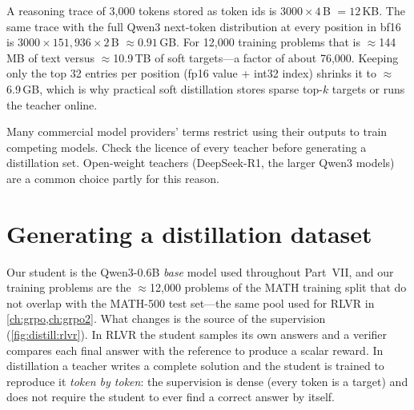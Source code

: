 \begin{napkinmath}
A reasoning trace of 3{,}000 tokens stored as token ids is $3000\times 4$\,B $=12$\,KB. The
same trace with the full Qwen3 next-token distribution at every position in bf16 is
$3000 \times 151{,}936 \times 2$\,B $\approx 0.91$\,GB. For 12{,}000 training problems that is
$\approx$144\,MB of text versus $\approx$10.9\,TB of soft targets---a factor of about 76{,}000.
Keeping only the top 32 entries per position (fp16 value + int32 index) shrinks it to
$\approx$6.9\,GB, which is why practical soft distillation stores sparse top-$k$ targets or
runs the teacher online.
\end{napkinmath}

\begin{pitfall}
Many commercial model providers' terms restrict using their outputs to train competing
models. Check the licence of every teacher before generating a distillation set. Open-weight
teachers (DeepSeek-R1, the larger Qwen3 models) are a common choice partly for this reason.
\end{pitfall}

\section{Generating a distillation dataset}\label{sec:distill:generate}

Our student is the Qwen3-0.6B \emph{base} model used throughout Part~VII, and our training
problems are the $\approx$12{,}000 problems of the MATH training split that do not overlap with
the MATH-500 test set---the same pool used for RLVR in \cref{ch:grpo,ch:grpo2}. What changes
is the source of the supervision (\cref{fig:distill:rlvr}). In RLVR the student samples its
own answers and a verifier compares each final answer with the reference to produce a scalar
reward. In distillation a teacher writes a complete solution and the student is trained to
reproduce it \emph{token by token}: the supervision is dense (every token is a target) and
does not require the student to ever find a correct answer by itself.

